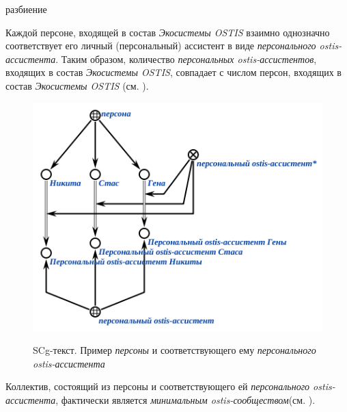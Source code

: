 \begin{SCn}
\begin{scnrelfromset}{разбиение}
\end{scnrelfromset}
\end{SCn}

Каждой персоне, входящей в состав \textit{Экосистемы OSTIS} взаимно однозначно соответствует его личный (персональный) ассистент в виде \textit{персонального ostis-ассистента}.
Таким образом, количество \textit{персональных ostis-ассистентов}, входящих в состав \textit{Экосистемы OSTIS}, совпадает с числом персон, входящих в состав \textit{Экосистемы OSTIS} (см. ).

\begin{figure}[H]
    \caption{SCg-текст. Пример \textit{персоны} и соответствующего ему \textit{персонального ostis-ассистента}}
    \includegraphics[scale=0.8]{author/part7/chapter_ecosystem/figures/personal_ostis_assistant_example_ru.png}
    \label{fig:ostis_assistant}
\end{figure}

Коллектив, состоящий из персоны и соответствующего ей \textit{персонального ostis-ассистента}, фактически является \textit{минимальным ostis-сообществом}(см. ).

